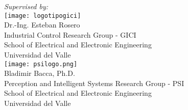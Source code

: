 \begin{titlepage}
\begin{minipage}{.95\linewidth}

\setcounter{page}{3} 

\begin{flushleft}    
 \vspace{8.0cm}
 \textit{Supervised by:}\\
 \vspace{2.5cm}
 \texttt{[image: logotipogici]}
	\\
	Dr.-Ing. Esteban Rosero\\ 
	Industrial Control Research Group - GICI\\
	School of Electrical and Electronic Engineering\\
	Universidad del Valle\\
 \vspace{2.5cm}	
 \texttt{[image: psilogo.png]}
   \\
	Bladimir Bacca, Ph.D.\\
	Perception and Intelligent Systems Research Group - PSI\\
	School of Electrical and Electronic Engineering\\
	Universidad del Valle\\
\end{flushleft} 
\end{minipage}
\hfill
\end{titlepage}
